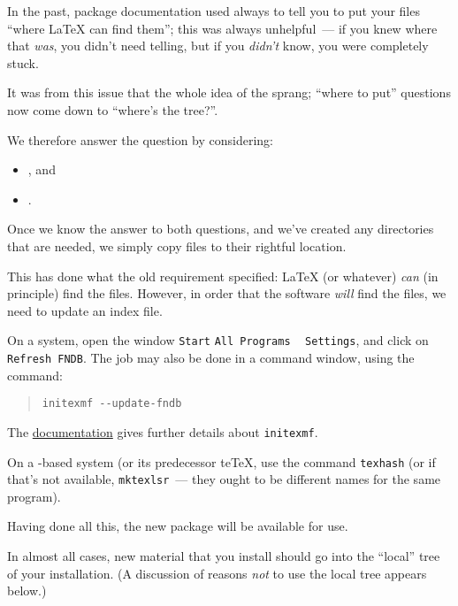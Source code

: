 In the past, package documentation used always to tell you to put your
files ``where \LaTeX{} can find them''; this was always unhelpful~---
if you knew where that \emph{was}, you didn't need telling, but if you
\emph{didn't} know, you were completely stuck.

It was from this issue that the whole idea of the  sprang;
``where to put'' questions now come down to ``where's the 
tree?''.

We therefore answer the question by considering:
\begin{itemize}
\item {}, and
\item {}.
\end{itemize}

Once we know the answer to both questions, and we've created any
directories that are needed, we simply copy files to their rightful
location.

This has done what the old requirement specified: \LaTeX{} (or
whatever) \emph{can} (in principle) find the files.  However, in order
that the software \emph{will} find the files, we need to update an
index file.

On a \miktex{} system, open the window
  \texttt{Start}\arrowhyph{}%
  \texttt{All Programs}\arrowhyph{}%
  \texttt{\miktex{} }\arrowhyph{}%
  \texttt{Settings},
and click on \texttt{Refresh FNDB}.
The job may also be done in a command window, using the command:
\begin{quote}
\begin{verbatim}
initexmf --update-fndb
\end{verbatim}
\end{quote}
The %
\href{http://docs.miktex.org/manual/initexmf.html}{\miktex{} documentation}
gives further details about \texttt{initexmf}.

On a \texlive{}-based system (or its predecessor te\TeX{}, use the command
\texttt{texhash} (or if that's not available, \texttt{mktexlsr}~---
they ought to be different names for the same program).

Having done all this, the new package will be available for use.


In almost all cases, new material that you install should go into the
``local'' tree of your \AllTeX{} installation.  (A discussion of
reasons \emph{not} to use the local tree appears below.)

